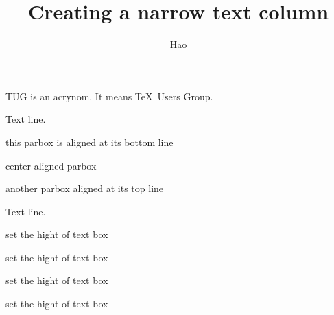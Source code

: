 \documentclass[a4paper,10pt]{article}
\title{Creating a narrow text column}
\author{Hao}
\begin{document}
\maketitle

\parbox{3cm}{TUG is an acrynom. It means \TeX\ Users Group.}


Text line. 
\quad\quad\quad\quad\parbox[b]{1.8cm}{this parbox is aligned at its bottom line}
\quad\parbox{1.5cm}{center-aligned parbox}
\quad\parbox[t]{2cm}{another parbox aligned at its top line}

Text line.
\parbox[c][5cm][b]{3cm}{set the hight of text box} %
\parbox[c][5cm][c]{3cm}{set the hight of text box} %
\parbox[c][5cm][t]{3cm}{set the hight of text box} %
\parbox[c][5cm][s]{3cm}{set the hight of text box} %
\end{document}
